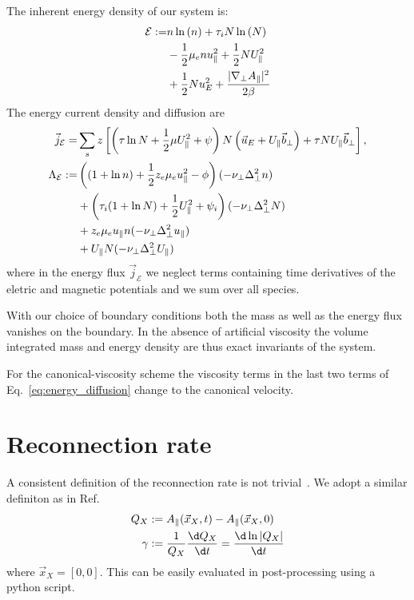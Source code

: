 The inherent energy density of our system is:
\begin{align}
 \mathcal{E} := &
                    n  \ln{(\ensuremath{n })}
                  + \tau_i N \ln{( \ensuremath{N})}
                  \nonumber \\
                 &- \frac{1}{2} \mu_e n  u_\parallel^2
                  + \frac{1}{2} N U_\parallel^2
                  \nonumber \\
                 &+\frac{1}{2} N u_E^2
                  + \frac{|\nabla_\perp A_\parallel|^2}{2 \beta}
\end{align}
The energy current density and diffusion are
\begin{align}
  \vec j_{\mathcal E} =& \sum_s z\left[
  \left(\tau \ln N + \frac{1}{2}\mu U_\parallel^2 + \psi \right)N\left(
  \vec u_E +U_\parallel \vec b_\perp  \right) + \tau NU_\parallel  \vec b_\perp\right]
  , \\
    \Lambda_\mathcal{E} :=  &\left( (1+\ln n ) + \frac{1}{2} z_e \mu_e u_\parallel^2 - \phi \right) (-\nu_\perp \Delta_\perp^2 n )
    \nonumber\\
    &+ \left( \tau_i ( 1+\ln N) + \frac{1}{2} U_\parallel^2 + \psi_i\right)(-\nu_\perp \Delta_\perp^2 N)
    \nonumber\\
    &+ z_e\mu_e u_\parallel n  (-\nu_\perp \Delta_\perp^2 u_\parallel)
    \nonumber\\
    &+ U_\parallel N (-\nu_\perp \Delta_\perp^2 U_\parallel)
    \label{eq:energy_diffusion}
\end{align}
where in the energy flux $\vec j_{\mathcal E}$
we neglect terms  containing time derivatives
of the eletric and magnetic potentials and we sum over all species.

With our choice of boundary conditions both the mass as well as the energy flux
vanishes on the boundary. In the absence of artificial viscosity the volume integrated
mass and energy density are thus exact invariants of the system.
\begin{tcolorbox}[title=Note]
    For the canonical-viscosity scheme the viscosity terms in the last two
    terms of Eq.~\eqref{eq:energy_diffusion} change to the canonical velocity.
\end{tcolorbox}


\section{Reconnection rate}
 A consistent definition of the reconnection rate is not trivial~\cite{Comisso2016}.
 We adopt a similar definiton as in Ref.~\cite{Comisso2013}
\begin{align}
    Q_X&:= \Apar(\vec{x}_X,t) - \Apar( \vec{x}_X,0) \\
 \gamma&:= \frac{1}{Q_X}\frac{\d Q_X}{\d t} = \frac{\d \ln{|Q_X|}}{\d t}
\end{align}
where $\vec{x}_X = [0,0]$.
This can be easily evaluated in post-processing using a python script.

